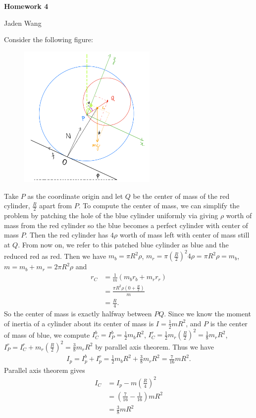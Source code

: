 \documentclass[12pt]{article}
\begin{document}
\centerline {\textsf{\textbf{\LARGE{Homework 4}}}}
\centerline {Jaden Wang}
\vspace{.15in}
Consider the following figure:
~\begin{figure}[H]
	\centering
	\includegraphics[width=0.6\textwidth]{./figures/hw4.1.png}
\end{figure}
Take $ P$ as the coordinate origin and let  $ Q$ be the center of mass of the red cylinder,  $ \frac{R}{2}$ apart from $ P$. To compute the center of mass, we can simplify the problem by patching the hole of the blue cylinder uniformly via giving  $ \rho$ worth of mass from the red cylinder so the blue becomes a perfect cylinder with center of mass  $ P$. Then the red cylinder has  $ 4 \rho$ worth of mass left with center of mass still at $ Q$. From now on, we refer to this patched blue cylinder as blue and the reduced red as red. Then we have $ m_b = \pi R^2 \rho$, $ m_r = \pi\left( \frac{R}{2} \right) ^2 4 \rho = \pi R^2 \rho = m_b$, $ m = m_b + m_r = 2 \pi R^2 \rho$ and
\begin{align*}
	r_C &= \frac{1}{m} (m_b r_b + m_r r_r) \\
	    &=\frac{\pi R^2 \rho \left(  0 + \frac{R}{2}\right) }{ m}\\ 
	    &= \frac{R}{4} .
\end{align*}
So the center of mass is exactly halfway between $ PQ$. Since we know the moment of inertia of a cylinder about its center of mass is $I = \frac{1}{2} mR^2$, and $ P$ is the center of mass of blue, we compute $ I_C^{b} = I_P^{b} = \frac{1}{2} m_b R^2$, $ I_C^r = \frac{1}{2} m_r \left( \frac{R}{2} \right) ^2 = \frac{1}{8} m_r R^2$, $ I_P^{r} = I_C^{r} + m_r \left( \frac{R}{2} \right) ^2 = \frac{3}{8}m_rR^2$ by parallel axis theorem. Thus we have
\begin{align*}
	I_p = I_p^b + I_p^r =\frac{1}{2}m_bR^2 + \frac{3}{8}m_rR^2 = \frac{7}{16} mR^2.
\end{align*}
Parallel axis theorem gives
\begin{align*}
	I_C &= I_p - m\left( \frac{R}{4} \right)^2  \\
	&= \left( \frac{7}{16}-\frac{1}{16} \right) mR^2 \\
	&= \frac{3}{8}mR^2 
\end{align*}
\end{document}
